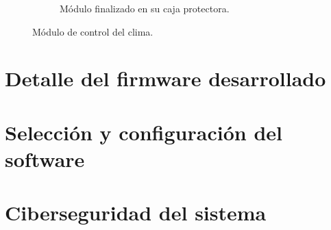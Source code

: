\begin{figure}[!htpb]
\begin{subfigure}[b]{0.45\textwidth}
		\caption{Módulo finalizado en su caja protectora.}
		\label{fig:vent3}
     \end{subfigure}
     \hfill
        \caption[Módulo de control del clima]{Módulo de control del clima.}
        \label{fig:soilsenors}
\end{figure}


\pagebreak

\section{Detalle del firmware desarrollado}
\label{sec:Desarrollo del firmware}




\section{Selección y configuración del software}
\label{sec:Selección y configuración del software}

\section{Ciberseguridad del sistema}
\label{sec:Ciberseguridad del sistema}
